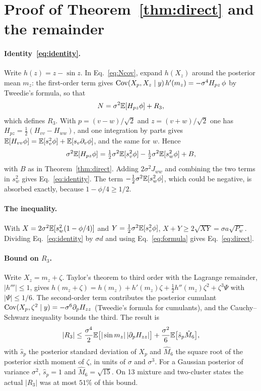 \section{Proof of Theorem~\ref{thm:direct} and the remainder}
\label{app:direct}

\paragraph*{Identity~\eqref{eq:identity}.}
Write $h(z) = z - \sin z$. In Eq.~\eqref{eq:Ncov}, expand $h(X_z)$ around the posterior mean $m_z$: the first-order term gives $\operatorname{Cov}(X_p, X_z\mid y)\,h'(m_z) = -\sigma^4 H_{pz}\,\phi$ by Tweedie's formula, so that
\begin{equation}
N = \sigma^2\mathbb{E}[H_{pz}\phi] + R_3,
\end{equation}
which defines $R_3$. With $p = (v-w)/\sqrt2$ and $z = (v+w)/\sqrt2$ one has $H_{pz} = \frac12(H_{vv} - H_{ww})$, and one integration by parts gives $\mathbb{E}[H_{vv}\phi] = \mathbb{E}[s_v^2\phi] + \mathbb{E}[s_v\partial_v\phi]$, and the same for $w$. Hence
\begin{equation}
\sigma^2\mathbb{E}[H_{pz}\phi] = \tfrac12\sigma^2\mathbb{E}[s_v^2\phi] - \tfrac12\sigma^2\mathbb{E}[s_w^2\phi] + B,
\end{equation}
with $B$ as in Theorem~\ref{thm:direct}. Adding $2\sigma^2 J_{ww}$ and combining the two terms in $s_w^2$ gives Eq.~\eqref{eq:identity}. The term $-\frac12\sigma^2\mathbb{E}[s_w^2\phi]$, which could be negative, is absorbed exactly, because $1 - \phi/4 \geq 1/2$.

\paragraph*{The inequality.}
With $X = 2\sigma^2\mathbb{E}[s_w^2(1-\phi/4)]$ and $Y = \frac12\sigma^2\mathbb{E}[s_v^2\phi]$, $X + Y \geq 2\sqrt{XY} = \sigma a\sqrt{P_w}$. Dividing Eq.~\eqref{eq:identity} by $\sigma d$ and using Eq.~\eqref{eq:formula} gives Eq.~\eqref{eq:direct}.

\paragraph*{Bound on $R_3$.}
Write $X_z = m_z + \zeta$. Taylor's theorem to third order with the Lagrange remainder, $|h'''| \leq 1$, gives $h(m_z + \zeta) = h(m_z) + h'(m_z)\zeta + \frac12 h''(m_z)\zeta^2 + \zeta^3\Psi$ with $|\Psi| \leq 1/6$. The second-order term contributes the posterior cumulant $\operatorname{Cov}(X_p, \zeta^2 \mid y) = -\sigma^6\partial_p H_{zz}$ (Tweedie's formula for cumulants), and the Cauchy--Schwarz inequality bounds the third. The result is
\begin{equation}
|R_3| \leq \frac{\sigma^4}{2}\mathbb{E}\big[|\sin m_z|\,|\partial_p H_{zz}|\big] + \frac{\sigma^2}{6}\mathbb{E}\big[\hat s_p \hat M_6\big],
\end{equation}
with $\hat s_p$ the posterior standard deviation of $X_p$ and $\hat M_6$ the square root of the posterior sixth moment of $\zeta$, in units of $\sigma$ and $\sigma^3$. For a Gaussian posterior of variance $\sigma^2$, $\hat s_p = 1$ and $\hat M_6 = \sqrt{15}$. On 13 mixture and two-cluster states the actual $|R_3|$ was at most $51\%$ of this bound.

